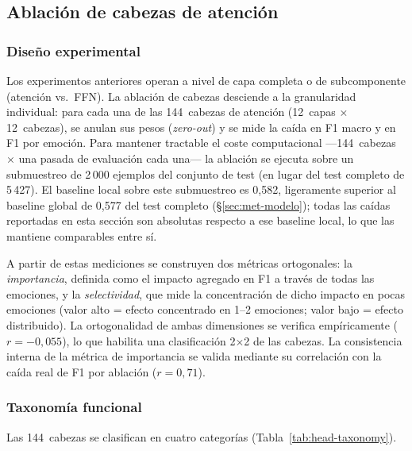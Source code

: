 \subsection{Ablación de cabezas de atención}
\label{sec:head-ablation}

\subsubsection{Diseño experimental}

Los experimentos anteriores operan a nivel de capa completa o de
subcomponente (atención vs.\ FFN). La ablación de cabezas desciende a
la granularidad individual: para cada una de las 144~cabezas de
atención (12~capas $\times$ 12~cabezas), se anulan sus pesos
(\textit{zero-out}) y se mide la caída en F1 macro y en F1 por
emoción. Para mantener tractable el coste computacional ---144~cabezas
$\times$ una pasada de evaluación cada una--- la ablación se ejecuta
sobre un submuestreo de 2\,000 ejemplos del conjunto de test (en lugar
del test completo de 5\,427). El baseline local sobre este submuestreo
es 0{,}582, ligeramente superior al baseline global de 0{,}577 del
test completo (\S\ref{sec:met-modelo}); todas las caídas reportadas en
esta sección son absolutas respecto a ese baseline local, lo que las
mantiene comparables entre sí.

A partir de estas mediciones se construyen dos métricas ortogonales:
la \emph{importancia}, definida como el impacto agregado en F1 a
través de todas las emociones, y la \emph{selectividad}, que mide la
concentración de dicho impacto en pocas emociones (valor alto = efecto
concentrado en 1--2 emociones; valor bajo = efecto distribuido). La
ortogonalidad de ambas dimensiones se verifica empíricamente
($r = -0{,}055$), lo que habilita una clasificación 2$\times$2 de las
cabezas. La consistencia interna de la métrica de importancia se
valida mediante su correlación con la caída real de F1 por ablación
($r = 0{,}71$).

\subsubsection{Taxonomía funcional}

Las 144~cabezas se clasifican en cuatro categorías
(Tabla~\ref{tab:head-taxonomy}).

